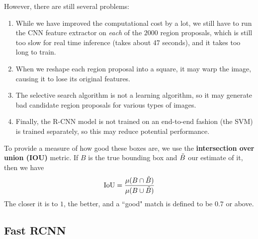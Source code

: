   However, there are still several problems: 
  \begin{enumerate}
      \item While we have improved the computational cost by a lot, we still have to run the CNN feature extractor on \textit{each} of the $2000$ region proposals, which is still too slow for real time inference (takes about 47 seconds), and it takes too long to train. 
      \item When we reshape each region proposal into a square, it may warp the image, causing it to lose its original features. 
      \item The selective search algorithm is not a learning algorithm, so it may generate bad candidate region proposals for various types of images.  
      \item Finally, the R-CNN model is not trained on an end-to-end fashion (the SVM) is trained separately, so this may reduce potential performance. 
  \end{enumerate} 

  \begin{definition}[IOU]
    \label{def:iou}
  To provide a measure of how good these boxes are, we use the \textbf{intersection over union (IOU)} metric. If $B$ is the true bounding box and $\Tilde{B}$ our estimate of it, then we have 
  \begin{equation}
    \mathrm{IoU} = \frac{\mu(B \cap \Tilde{B})}{\mu(B \cup \Tilde{B})}
  \end{equation}
  The closer it is to $1$, the better, and a ``good" match is defined to be $0.7$ or above.  
  \end{definition} 

\subsection{Fast RCNN}

